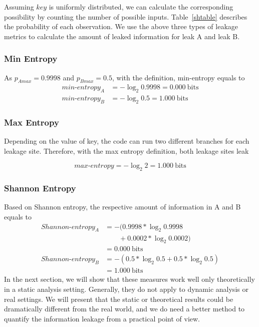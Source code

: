 Assuming $\mathit{key}$ is uniformly distributed, we can calculate the corresponding
possibility by counting the number of possible inputs. Table~\ref{shtable}
describes the probability of each observation. We use the above three types of
leakage metrics to calculate the amount of leaked information for leak A and leak B.

\subsubsection*{Min Entropy}
As $p_{A\mathit{max}} = 0.9998$ and $p_{B\mathit{max}} = 0.5$,
with the definition, min-entropy equals to
\begin{align*}
    \mathit{min\text{-}entropy_A} & = -\log_2{0.9998} = 0.000\ \mathrm{bits} \\
    \mathit{min\text{-}entropy_B} & = -\log_2{0.5} = 1.000\ \mathrm{bits}
\end{align*}

\subsubsection*{Max Entropy}
Depending on the value of key, the code can run two different branches for each leakage site.
Therefore, with the max entropy
definition, both leakage sites leak

\begin{displaymath}
    \mathit{max\text{-}entropy} = -\log_2{2} = 1.000\ \mathrm{bits}
\end{displaymath}

\subsubsection*{Shannon Entropy}
Based on Shannon entropy, the respective amount of information in A and B equals to
    {%
        \begin{align*}
            \mathit{Shannon\text{-}entropy_A} & = -(0.9998*\log_{2}0.9998      \\
                                              & \qquad+ 0.0002*\log_{2}0.0002) \\
                                              & = 0.000\ \mathrm{bits}         \\
            \mathit{Shannon\text{-}entropy_B} & = -(0.5*\log_{2}0.5 + 0.5*\log_{2}0.5)       \\
                                              & = 1.000\ \mathrm{bits}
        \end{align*}
    }
In the next section, we will show that these measures work well only
theoretically in a static analysis setting.
Generally, they do not apply to dynamic analysis or real
settings. We will present that the static or theoretical results could be
dramatically different from the real world, and we do need a better method to
quantify the information leakage from a practical point of view.

